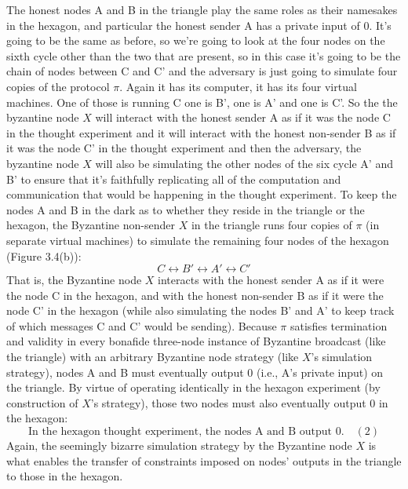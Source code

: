 The honest nodes A and B in the triangle play the same roles as their namesakes in the
hexagon, and particular the honest sender A has a private input of 0. 
It's going to be the same as before, so we're going to look at the four nodes on the sixth cycle other than the two that are present, so in this case
it's going to be the chain of nodes between C and C' and the adversary is just going to simulate four copies
of the protocol $\pi$. Again it has its computer, it has its four virtual machines. One of those is
running C one is B', one is A' and one is C'. So the the byzantine node $X$ will interact with the honest sender A as
if it was the node C in the thought experiment and it will interact with the honest non-sender B as
if it was the node C' in the thought experiment and then the adversary, the byzantine node $X$ will also be simulating the other nodes of the six cycle A' and B' to ensure that it's faithfully
replicating all of the computation and communication that would be happening in the thought experiment.
To keep the nodes A
and B in the dark as to whether they reside in the triangle or the hexagon, the Byzantine
non-sender $X$ in the triangle runs four copies of $\pi$ (in separate virtual machines) to simulate
the remaining four nodes of the hexagon (Figure 3.4(b)):
$$C \leftrightarrow B' \leftrightarrow A' \leftrightarrow C'$$
That is, the Byzantine node $X$ interacts with the honest sender A as if it were the node C
in the hexagon, and with the honest non-sender B as if it were the node C' in the hexagon
(while also simulating the nodes B' and A' to keep track of which messages C and C'  would
be sending). Because $\pi$ satisfies termination and validity in every bonafide three-node instance of
Byzantine broadcast (like the triangle) with an arbitrary Byzantine node strategy (like $X$’s
simulation strategy), nodes A and B must eventually output 0 (i.e., A’s private input) on
the triangle. By virtue of operating identically in the hexagon experiment (by construction
of $X$’s strategy), those two nodes must also eventually output 0 in the hexagon:
$$\text{In the hexagon thought experiment, the nodes A and B output 0.} \quad (2)$$
Again, the seemingly bizarre simulation strategy by the Byzantine node $X$ is what enables
the transfer of constraints imposed on nodes’ outputs in the triangle to those in the hexagon.


